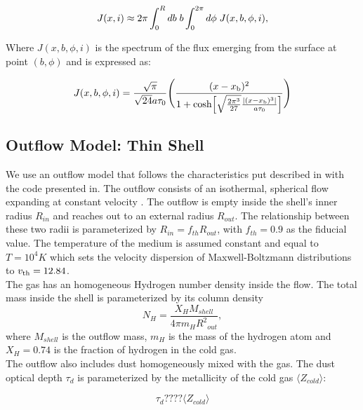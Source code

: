 \documentclass{latex/emulateapj}
\begin{document}
\begin{equation}
J(x,i) \approx 2\pi \int_0^Rdb \hs b
\int_0^{2\pi}d\phi \hs J(x,b,\phi,i),
\end{equation}

Where $J(x, b, \phi, i)$ is the spectrum of the flux emerging from the surface at point $(b, \phi)$ and is expressed as: 

\begin{equation}
J(x,b,\phi,i)=\frac{\sqrt{\pi}}{\sqrt{24}a\tau_0}\Bigg{(}\frac{(x-x_{\rm
    b})^2}{1+{\rm cosh}\Big{[}\sqrt{\frac{2\pi^3}{27}}\frac{|(x-x_{\rm
        b})^3|}{a\tau_0}\Big{]}}\Bigg{)} 
\end{equation}


\subsection{Outflow Model: Thin Shell}

We use an outflow model that follows the characteristics put described in \citep{Verhamme06} with the code presented in\citep{Orsi12}.  The outflow consists of an isothermal, spherical flow expanding at
constant velocity \vout.  The outflow is empty inside the shell's inner radius $R_{in}$ and reaches out to an external radius $R_{out}$. The relationship between these two radii is parameterized by $R_{in} =
f_{th}R_{out}$, with $f_{th}=0.9$ as the fiducial value. The temperature of the medium is assumed constant and equal to $T=10^4 K$ which sets the velocity dispersion of Maxwell-Boltzmann distributions to $v_{\rm th}=12.84$\kms. \\

The gas has an homogeneous Hydrogen number density inside the flow. The total mass inside the shell is parameterized by its column density\\

\begin{equation}
\label{eq:nh}
N_H = \frac{X_H M_{shell}}{4\pi m_H {R^2}_{out}},
\end{equation}
%
where $M_{shell}$ is the outflow mass, $m_H$ is the mass of the hydrogen atom and $X_H=0.74$ is the fraction of hydrogen in the cold gas.\\

The outflow also includes dust homogeneously mixed with the gas. The dust optical depth $\tau_d$ is parameterized by the metallicity of the cold gas $\langle Z_{cold} \rangle$: 

\begin{equation}
\label{eq:z}
\tau_{d} ???? \langle Z_{cold} \rangle
\end{equation}
\end{document}
